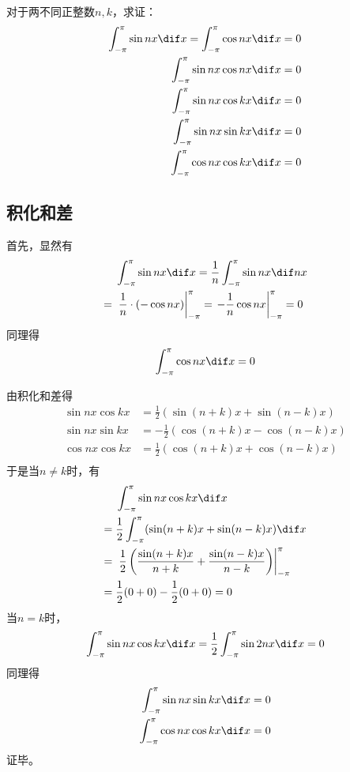 

对于两不同正整数$n, k$，求证：
\begin{align*}
  \int_{-\pi}^\pi \sin nx \dif x = \int_{-\pi}^\pi \cos nx \dif x &= 0 \\
  \int_{-\pi}^\pi \sin nx \cos nx \dif x &= 0 \\
  \int_{-\pi}^\pi \sin nx \cos kx \dif x &= 0 \\
  \int_{-\pi}^\pi \sin nx \sin kx \dif x &= 0 \\
  \int_{-\pi}^\pi \cos nx \cos kx \dif x &= 0
\end{align*}

\subsection{积化和差}

首先，显然有
\begin{align*}
  & \int_{-\pi}^\pi \sin nx \dif x = \frac1n \int_{-\pi}^\pi \sin nx \dif nx \\
  ={}& \left.\frac1n \cdot (-\cos nx)\right|_{-\pi}^\pi = \left.-\frac1n\cos nx\right|_{-\pi}^\pi = 0
\end{align*}
同理得
\[ \int_{-\pi}^\pi \cos nx \dif x = 0 \]

由积化和差得
\begin{align*}
  \sin nx \cos kx &= \frac12(\sin(n + k)x + \sin(n - k)x) \\
  \sin nx \sin kx &= -\frac12(\cos(n + k)x - \cos(n - k)x) \\
  \cos nx \cos kx &= \frac12(\cos(n + k)x + \cos(n - k)x) \\
\end{align*}
于是当$n \ne k$时，有
\begin{align*}
  & \int_{-\pi}^\pi \sin nx \cos kx \dif x \\
  ={}& \frac12\int_{-\pi}^\pi (\sin(n + k)x + \sin(n - k)x) \dif x \\
  ={}& \left.\frac12\left(\frac{\sin(n + k)x}{n + k} + \frac{\sin(n - k)x}{n - k}\right)\right|_{-\pi}^\pi \\
  ={}& \frac12(0 + 0) - \frac12(0 + 0) = 0
\end{align*}
当$n = k$时，
\[ \int_{-\pi}^\pi \sin nx \cos kx \dif x = \frac12\int_{-\pi}^\pi \sin 2nx \dif x = 0 \]
同理得
\begin{align*}
  \int_{-\pi}^\pi \sin nx \sin kx \dif x &= 0 \\
  \int_{-\pi}^\pi \cos nx \cos kx \dif x &= 0
\end{align*}
证毕。
